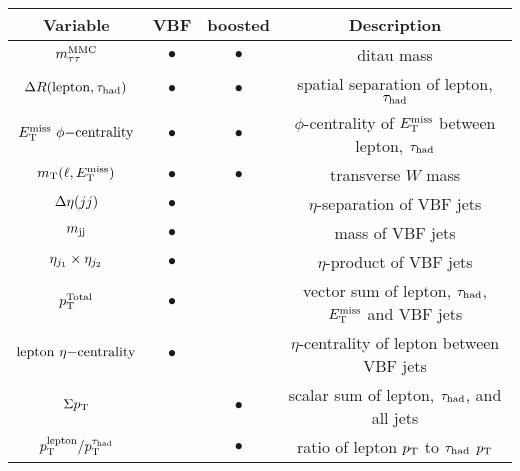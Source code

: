 \begin{tabular}{c|c|c|c}
Variable      & VBF       & boosted   & Description \\ 
\hline
$m_{\tau\tau}^\text{MMC}$       & $\bullet$ & $\bullet$ & ditau mass \\
$\Delta{}R(\mathrm{lepton}, \tau_\text{had})$         & $\bullet$ & $\bullet$ & spatial separation of lepton, $\tau_\text{had}$ \\
$E_{\mathrm{T}}^{\mathrm{miss}}\ \phi\mathrm{-centrality}$ & $\bullet$ & $\bullet$ & $\phi$-centrality of $E_{\mathrm{T}}^{\mathrm{miss}}$ between lepton, $\tau_\text{had}$ \\
$m_\text{T}(\ell, E_{\mathrm{T}}^{\mathrm{miss}})$         & $\bullet$ & $\bullet$ & transverse $W$ mass\\
$\deta$       & $\bullet$ &           & $\eta$-separation of VBF jets \\
$m_{\text{jj}}$        & $\bullet$ &           & mass of VBF jets \\
$\etaprod$    & $\bullet$ &           & $\eta$-product of VBF jets \\ 
$p_\mathrm{T}^{\mathrm{Total}}$      & $\bullet$ &           & vector sum of lepton, $\tau_\text{had}$, $E_{\mathrm{T}}^{\mathrm{miss}}$ and VBF jets \\
$\lepetacent$ & $\bullet$ &           & $\eta$-centrality of lepton between VBF jets \\
$\Sigma p_\mathrm{T}$      &           & $\bullet$ & scalar sum of lepton, $\tau_\text{had}$, and all jets \\
$p_\mathrm{T}^{\mathrm{lepton}}/p_\mathrm{T}^{\tau_\text{had}}$    &           & $\bullet$ & ratio of lepton $p_{\mathrm{T}}$ to $\tau_\text{had}$ $p_{\mathrm{T}}$ \\
\end{tabular}


